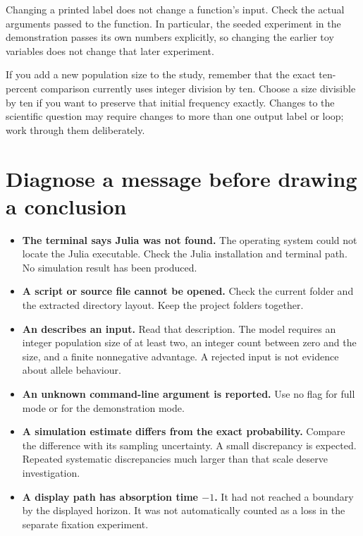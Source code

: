 Changing a printed label does not change a function's input. Check the
actual arguments passed to the function. In particular, the seeded experiment
in the demonstration passes its own numbers explicitly, so changing the
earlier toy variables does not change that later experiment.

If you add a new population size to the study, remember that the exact
ten-percent comparison currently uses integer division by ten. Choose a
size divisible by ten if you want to preserve that initial frequency exactly.
Changes to the scientific question may require changes to more than one
output label or loop; work through them deliberately.

\section{Diagnose a message before drawing a conclusion}

\begin{itemize}
 \item \textbf{The terminal says Julia was not found.} The operating system
       could not locate the Julia executable. Check the Julia installation
       and terminal path. No simulation result has been produced.
 \item \textbf{A script or source file cannot be opened.} Check the current
       folder and the extracted directory layout. Keep the project folders
       together.
 \item \textbf{An  describes an input.} Read that
       description. The model requires an integer population size of at
       least two, an integer count between zero and the size, and a finite
       nonnegative advantage. A rejected input is not evidence about allele
       behaviour.
 \item \textbf{An unknown command-line argument is reported.} Use no flag
       for full mode or  for the demonstration mode.
 \item \textbf{A simulation estimate differs from the exact probability.}
       Compare the difference with its sampling uncertainty. A small
       discrepancy is expected. Repeated systematic discrepancies much
       larger than that scale deserve investigation.
 \item \textbf{A display path has absorption time \(-1\).} It had not
       reached a boundary by the displayed horizon. It was not automatically
       counted as a loss in the separate fixation experiment.
\end{itemize}

